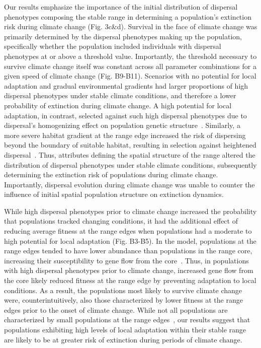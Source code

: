 \documentclass[11pt]{article}
\begin{document}
Our results emphasize the importance of the initial distribution of dispersal phenotypes composing the stable range in determining a population's extinction risk during climate change (Fig. 3c\&d). Survival in the face of climate change was primarily determined by the dispersal phenotypes making up the population, specifically whether the population included individuals with dispersal phenotypes at or above a threshold value. Importantly, the threshold necessary to survive climate change itself was constant across all parameter combinations for a given speed of climate change (Fig. B9-B11). Scenarios with no potential for local adaptation and gradual environmental gradients had larger proportions of high dispersal phenotypes under stable climate conditions, and therefore a lower probability of extinction during climate change. A high potential for local adaptation, in contrast, selected against such high dispersal phenotypes due to dispersal's homogenizing effect on population genetic structure~\citep{lenormand2002gene}. Similarly, a more severe habitat gradient at the range edge increased the risk of dispersing beyond the boundary of suitable habitat, resulting in selection against heightened dispersal~\citep{shaw2014population}. Thus, attributes defining the spatial structure of the range altered the distribution of dispersal phenotypes under stable climate conditions, subsequently determining the extinction risk of populations during climate change. Importantly, dispersal evolution during climate change was unable to counter the influence of initial spatial population structure on extinction dynamics.

While high dispersal phenotypes prior to climate change increased the probability that populations tracked changing conditions, it had the additional effect of reducing average fitness at the range edges when populations had a moderate to high potential for local adaptation (Fig. B3-B5). In the model, populations at the range edges tended to have lower abundance than populations in the range core, increasing their susceptibility to gene flow from the core~\citep{lenormand2002gene}. Thus, in populations with high dispersal phenotypes prior to climate change, increased gene flow from the core likely reduced fitness at the range edge by preventing adaptation to local conditions. As a result, the populations most likely to survive climate change were, counterintuitively, also those characterized by lower fitness at the range edges prior to the onset of climate change. While not all populations are characterized by small populations at the range edges~\citep{dallas2017species}, our results suggest that populations exhibiting high levels of local adaptation within their stable range are likely to be at greater risk of extinction during periods of climate change.
\end{document}
